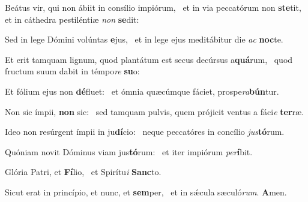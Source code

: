 \item Beátus vir, qui non ábiit in consílio impiórum,~\pscross{} et in via peccatórum non \textbf{ste}tit,~\psstar{} et in cáthedra pestiléntiæ \textit{non} \textbf{se}dit:
\item Sed in lege Dómini volúntas \textbf{e}jus,~\psstar{} et in lege ejus meditábitur die \textit{ac} \textbf{noc}te.
\item Et erit tamquam lignum, quod plantátum est secus decúrsus a\textbf{quá}rum,~\psstar{} quod fructum suum dabit in témpo\textit{re} \textbf{su}o:
\item Et fólium ejus non \textbf{dé}fluet:~\psstar{} et ómnia quæcúmque fáciet, prospe\textit{ra}\textbf{bún}tur.
\item Non sic ímpii, \textbf{non} sic:~\psstar{} sed tamquam pulvis, quem prójicit ventus a fáci\textit{e} \textbf{ter}ræ.
\item Ideo non resúrgent ímpii in ju\textbf{dí}cio:~\psstar{} neque peccatóres in concílio \textit{jus}\textbf{tó}rum.
\item Quóniam novit Dóminus viam jus\textbf{tó}rum:~\psstar{} et iter impiórum \textit{per}\textbf{í}bit.
\item Glória Patri, et \textbf{Fí}lio,~\psstar{} et Spirítu\textit{i} \textbf{Sanc}to.
\item Sicut erat in princípio, et nunc, et \textbf{sem}per,~\psstar{} et in sǽcula sæculó\textit{rum}. \textbf{A}men.
